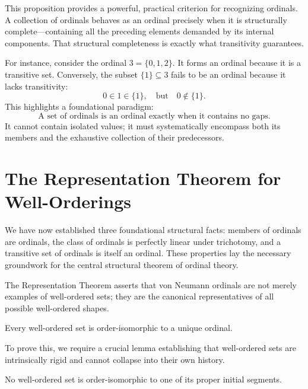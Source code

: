 \documentclass[11pt]{article}
\begin{document}
This proposition provides a powerful, practical criterion for recognizing ordinals. A collection of ordinals behaves as an ordinal precisely when it is structurally complete—containing all the preceding elements demanded by its internal components. That structural completeness is exactly what transitivity guarantees.

For instance, consider the ordinal $3 = \{0, 1, 2\}$. It forms an ordinal because it is a transitive set. Conversely, the subset $\{1\} \subseteq 3$ fails to be an ordinal because it lacks transitivity: 
\[
0 \in 1 \in \{1\}, \quad \text{but} \quad 0 \notin \{1\}.
\]
This highlights a foundational paradigm:
\[
\boxed{\text{A set of ordinals is an ordinal exactly when it contains no gaps.}}
\]
It cannot contain isolated values; it must systematically encompass both its members and the exhaustive collection of their predecessors.

\section{The Representation Theorem for Well-Orderings}

We have now established three foundational structural facts: members of ordinals are ordinals, the class of ordinals is perfectly linear under trichotomy, and a transitive set of ordinals is itself an ordinal. These properties lay the necessary groundwork for the central structural theorem of ordinal theory.

The Representation Theorem asserts that von Neumann ordinals are not merely examples of well-ordered sets; they are the canonical representatives of all possible well-ordered shapes.

\begin{theorem}
Every well-ordered set is order-isomorphic to a unique ordinal.
\end{theorem}

To prove this, we require a crucial lemma establishing that well-ordered sets are intrinsically rigid and cannot collapse into their own history.

\begin{lemma}
No well-ordered set is order-isomorphic to one of its proper initial segments.
\end{lemma}
\end{document}
